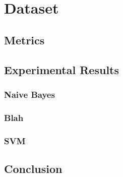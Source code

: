 
\section{Dataset}

\subsection{Metrics}

\subsection{Experimental Results}
\subsubsection{Naive Bayes}
\subsubsection{Blah}
\subsubsection{SVM}

\subsection{Conclusion}
